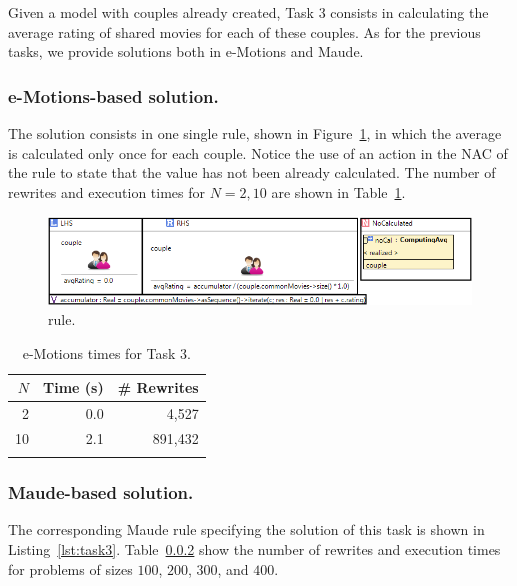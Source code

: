 
Given a model with couples already created, Task 3 consists in calculating the average rating of shared movies for each of these couples. As for the previous tasks, we provide solutions both in e-Motions and Maude. 

\subsubsection{e-Motions-based solution.}

The solution consists in one single rule, shown in Figure~\ref{fig:computingAvgRating}, in which the average is calculated only once for each couple. Notice the use of an action in the NAC of the rule to state that the value has not been already calculated. The number of rewrites and execution times for $N=2, 10$ are shown in Table~\ref{table:emotionstask3}.

\begin{figure}[htp]
  \centering
  \includegraphics[width=\textwidth]{imgs/computingAvgRating}
  \caption{ rule.}\label{fig:computingAvgRating}
\end{figure}

\begin{table}[tb]
\renewcommand{\tabcolsep}{6pt}
\renewcommand{\arraystretch}{1.2}
    \centering
	\begin{tabular}{r r r}
	$N$ & Time (s) & \# Rewrites \\
	\hline
	2 & 0.0 & 4,527 \\
	10 & 2.1 & 891,432 \\
	\hline \\
	\end{tabular}
	\caption{e-Motions times for Task 3.}\label{table:emotionstask3}
\end{table}

\subsubsection{Maude-based solution.}
The corresponding Maude rule specifying the solution of this task is shown in Listing~\ref{lst:task3}. Table~\ref{} show the number of rewrites and execution times for problems of sizes $100$, $200$, $300$, and $400$.


